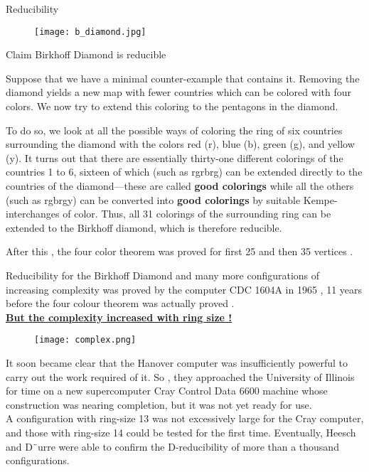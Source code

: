 \documentclass[12pt]{beamer}
\begin{document}
\begin{frame}{Reducibility}
\begin{figure}
\texttt{[image: b\_diamond.jpg]}
\end{figure}

\begin{block}{Claim}
Birkhoff Diamond is reducible
\end{block}
Suppose that we have a minimal counter-example that contains it. Removing the diamond yields a new map with fewer countries which can be colored with four colors. We now try to extend this coloring to the pentagons in the diamond.
\end{frame}

\begin{frame}
To do so, we look at all the possible ways of coloring the ring of six countries surrounding the diamond with the colors red (r), blue (b), green (g), and
yellow (y). It turns out that there are essentially thirty-one different colorings
of the countries 1 to 6, sixteen of which (such as rgrbrg) can be extended directly to the countries of the diamond—these are called \textbf{good colorings} while
all the others (such as rgbrgy) can be converted into \textbf{good colorings} by suitable
Kempe-interchanges of color. Thus, all 31 colorings of the surrounding ring
can be extended to the Birkhoff diamond, which is therefore reducible.
\end{frame}


\begin{frame}
After this , the four color theorem was proved for first 25 and then 35 vertices .
\end{frame}

\begin{frame}
Reducibility for the Birkhoff Diamond and many more configurations of increasing complexity was proved by the computer CDC
1604A in 1965 , 11 years before the four colour theorem was actually proved .\\
\textbf{\underline{ But the complexity increased with ring size !}}
\begin{figure}
\texttt{[image: complex.png]}
\end{figure}
\end{frame}

\begin{frame}
It soon became clear that the Hanover computer was insufficiently powerful to carry out the work required of it. 
So , they approached the University of Illinois for time on a new supercomputer Cray Control Data 6600
machine whose construction was nearing completion, but it was not yet ready for use.\\
A configuration with ring-size
13 was not excessively large for the Cray computer, and those with ring-size 14 could be tested for the first time. Eventually, Heesch and D¨urre were able to confirm the D-reducibility of more than a thousand configurations.
\end{frame}
\end{document}
